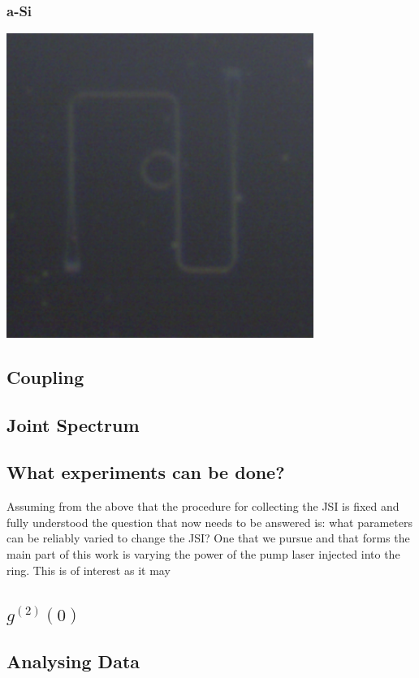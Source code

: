 \subsubsection{a-Si}
\begingroup
    \centering  
    \includegraphics[width=10cm]{img/results/chipPictures/exampleASIRing.png}
     \vspace{3pt} \label{crossCompare}
\endgroup
\subsection{Coupling}
\subsection{Joint Spectrum}
\subsection{What experiments can be done?}
Assuming from the above that the procedure for collecting the JSI is fixed and fully understood the question that now needs to be answered is: what parameters can be reliably varied to change the JSI?
One that we pursue and that forms the main part of this work is varying the power of the pump laser injected into the ring. This is of interest as it may 
\subsection{$g^{(2)}(0)$}
\subsection{Analysing Data}

